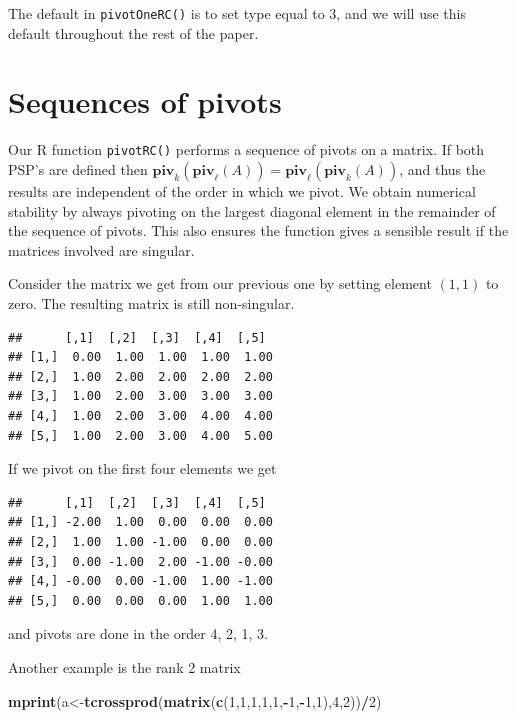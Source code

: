 \documentclass[12pt,]{article}
\newenvironment{Shaded}{\begin{snugshade}}{\end{snugshade}}
\newcommand{\KeywordTok}[1]{\textcolor[rgb]{0.13,0.29,0.53}{\textbf{#1}}}
\newcommand{\DecValTok}[1]{\textcolor[rgb]{0.00,0.00,0.81}{#1}}
\newcommand{\OperatorTok}[1]{\textcolor[rgb]{0.81,0.36,0.00}{\textbf{#1}}}
\newcommand{\NormalTok}[1]{#1}
\begin{document}
The default in \texttt{pivotOneRC()} is to set type equal to 3, and we
will use this default throughout the rest of the paper.

\section{Sequences of pivots}\label{sequences-of-pivots}

Our R function \texttt{pivotRC()} performs a sequence of pivots on a
matrix. If both PSP's are defined then
\(\mathbf{piv}_k(\mathbf{piv}_\ell(A))=\mathbf{piv}_\ell(\mathbf{piv}_k(A))\),
and thus the results are independent of the order in which we pivot. We
obtain numerical stability by always pivoting on the largest diagonal
element in the remainder of the sequence of pivots. This also ensures
the function gives a sensible result if the matrices involved are
singular.

Consider the matrix we get from our previous one by setting element
\((1,1)\) to zero. The resulting matrix is still non-singular.

\begin{verbatim}
##      [,1]  [,2]  [,3]  [,4]  [,5] 
## [1,]  0.00  1.00  1.00  1.00  1.00
## [2,]  1.00  2.00  2.00  2.00  2.00
## [3,]  1.00  2.00  3.00  3.00  3.00
## [4,]  1.00  2.00  3.00  4.00  4.00
## [5,]  1.00  2.00  3.00  4.00  5.00
\end{verbatim}

If we pivot on the first four elements we get

\begin{verbatim}
##      [,1]  [,2]  [,3]  [,4]  [,5] 
## [1,] -2.00  1.00  0.00  0.00  0.00
## [2,]  1.00  1.00 -1.00  0.00  0.00
## [3,]  0.00 -1.00  2.00 -1.00 -0.00
## [4,] -0.00  0.00 -1.00  1.00 -1.00
## [5,]  0.00  0.00  0.00  1.00  1.00
\end{verbatim}

and pivots are done in the order 4, 2, 1, 3.

Another example is the rank 2 matrix

\begin{Shaded}
\begin{Highlighting}[]
\KeywordTok{mprint}\NormalTok{(a<-}\KeywordTok{tcrossprod}\NormalTok{(}\KeywordTok{matrix}\NormalTok{(}\KeywordTok{c}\NormalTok{(}\DecValTok{1}\NormalTok{,}\DecValTok{1}\NormalTok{,}\DecValTok{1}\NormalTok{,}\DecValTok{1}\NormalTok{,}\DecValTok{1}\NormalTok{,}\OperatorTok{-}\DecValTok{1}\NormalTok{,}\OperatorTok{-}\DecValTok{1}\NormalTok{,}\DecValTok{1}\NormalTok{),}\DecValTok{4}\NormalTok{,}\DecValTok{2}\NormalTok{))}\OperatorTok{/}\DecValTok{2}\NormalTok{)}
\end{Highlighting}
\end{Shaded}
\end{document}
